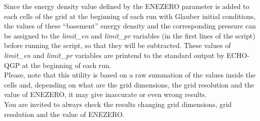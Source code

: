 \begin{description}
Since the energy density value defined by the ENEZERO parameter is added to each cells of the grid at the beginning of each run with Glauber initial conditions, the values of these ``basement'' energy density and the corresponding pressure can be assigned to the \emph{limit\_en} and \emph{limit\_pr} variables (in the first lines of the script) before running the script, so that they will be subtracted. These values of \emph{limit\_en} and \emph{limit\_pr} variables are printend to the standard output by ECHO-QGP at the beginning of each run.\\
Please, note that this utility is based on a raw summation of the values inside the cells and, depending on what are the grid dimensions, the grid resolution and the value of ENEZERO, it may give inaccurate or even wrong results.\\
You are invited to always check the results changing grid dimensions, grid resolution and the value of ENEZERO.
\end{description}

